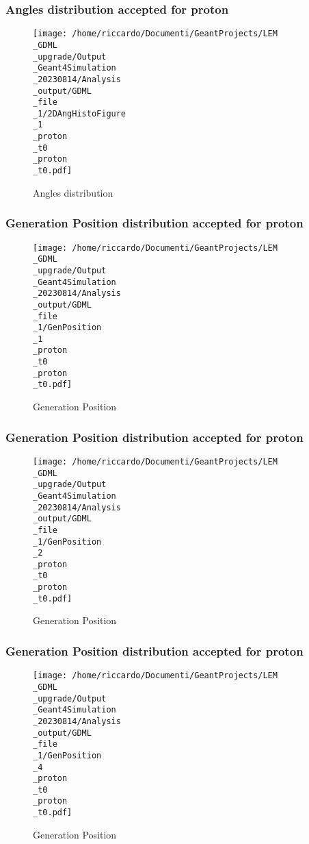 \documentclass[8pt]{beamer}
\begin{document}
            \begin{frame}
                \frametitle{Angles distribution accepted for proton}
            
        \begin{figure}[h]
            \centering
            \texttt{[image: /home/riccardo/Documenti/GeantProjects/LEM\\\_GDML\\\_upgrade/Output\\\_Geant4Simulation\\\_20230814/Analysis\\\_output/GDML\\\_file\\\_1/2DAngHistoFigure\\\_1\\\_proton\\\_t0\\\_proton\\\_t0.pdf]}
            \caption{Angles distribution}
        \end{figure}
        
            \end{frame}
            
            \begin{frame}
                \frametitle{Generation Position distribution accepted for proton}
            
        \begin{figure}[h]
            \centering
            \texttt{[image: /home/riccardo/Documenti/GeantProjects/LEM\\\_GDML\\\_upgrade/Output\\\_Geant4Simulation\\\_20230814/Analysis\\\_output/GDML\\\_file\\\_1/GenPosition\\\_1\\\_proton\\\_t0\\\_proton\\\_t0.pdf]}
            \caption{Generation Position}
        \end{figure}
        
            \end{frame}
            
            \begin{frame}
                \frametitle{Generation Position distribution accepted for proton}
            
        \begin{figure}[h]
            \centering
            \texttt{[image: /home/riccardo/Documenti/GeantProjects/LEM\\\_GDML\\\_upgrade/Output\\\_Geant4Simulation\\\_20230814/Analysis\\\_output/GDML\\\_file\\\_1/GenPosition\\\_2\\\_proton\\\_t0\\\_proton\\\_t0.pdf]}
            \caption{Generation Position}
        \end{figure}
        
            \end{frame}
            
            \begin{frame}
                \frametitle{Generation Position distribution accepted for proton}
            
        \begin{figure}[h]
            \centering
            \texttt{[image: /home/riccardo/Documenti/GeantProjects/LEM\\\_GDML\\\_upgrade/Output\\\_Geant4Simulation\\\_20230814/Analysis\\\_output/GDML\\\_file\\\_1/GenPosition\\\_4\\\_proton\\\_t0\\\_proton\\\_t0.pdf]}
            \caption{Generation Position}
        \end{figure}
        
            \end{frame}
            
\end{document}
